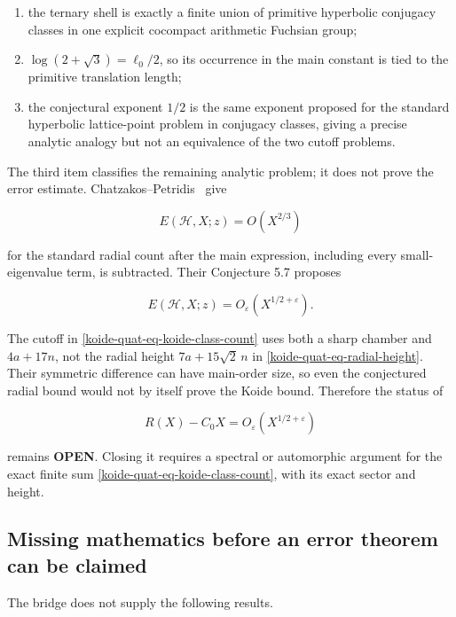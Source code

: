 \begin{enumerate}
\def\labelenumi{\arabic{enumi}.}
\item
  the ternary shell is exactly a finite union of primitive hyperbolic conjugacy classes in one explicit cocompact arithmetic Fuchsian group;
\item
  \(\log(2+\sqrt3)=\ell_0/2\), so its occurrence in the main constant is tied to the primitive translation length;
\item
  the conjectural exponent \(1/2\) is the same exponent proposed for the standard hyperbolic lattice-point problem in conjugacy classes, giving a precise analytic analogy but not an equivalence of the two cutoff problems.
\end{enumerate}

The third item classifies the remaining analytic problem; it does not prove the
error estimate. Chatzakos--Petridis~\cite[Theorem~1.1]{ChatzakosPetridis_2016}
give

\[
 E(\mathcal H,X;z)=O(X^{2/3})
\]

for the standard radial count after the main expression, including every small-eigenvalue term, is subtracted. Their Conjecture 5.7 proposes

\[
 E(\mathcal H,X;z)=O_\varepsilon(X^{1/2+\varepsilon}).
\]

The cutoff in \eqref{koide-quat-eq-koide-class-count} uses both a sharp chamber and \(4a+17n\), not the radial height \(7a+15\sqrt2\,n\) in \eqref{koide-quat-eq-radial-height}. Their symmetric difference can have main-order size, so even the conjectured radial bound would not by itself prove the Koide bound. Therefore the status of

\[
 R(X)-C_0X=O_\varepsilon(X^{1/2+\varepsilon})
\]

remains \textbf{OPEN}. Closing it requires a spectral or automorphic argument for the exact finite sum \eqref{koide-quat-eq-koide-class-count}, with its exact sector and height.

\subsection{Missing mathematics before an error theorem can be claimed}\label{koide-quat-missing-mathematics-before-an-error-theorem-can-be-claimed}

The bridge does not supply the following results.


